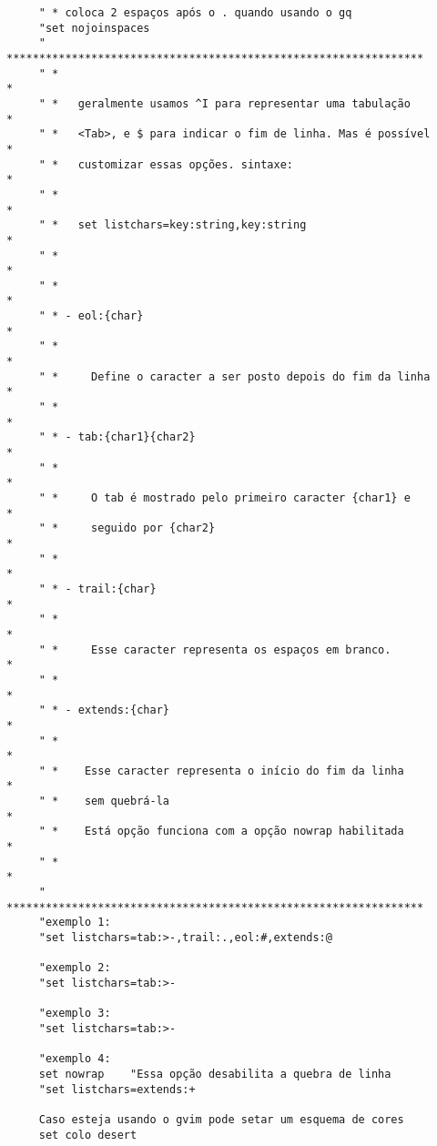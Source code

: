 \begin{verbatim}
     " * coloca 2 espaços após o . quando usando o gq
     "set nojoinspaces
     " ****************************************************************
     " *                                                              *
     " *   geralmente usamos ^I para representar uma tabulação        *
     " *   <Tab>, e $ para indicar o fim de linha. Mas é possível     *
     " *   customizar essas opções. sintaxe:                          *
     " *                                                              *
     " *   set listchars=key:string,key:string                        *
     " *                                                              *
     " *                                                              *
     " * - eol:{char}                                                 *
     " *                                                              *
     " *     Define o caracter a ser posto depois do fim da linha     *
     " *                                                              *
     " * - tab:{char1}{char2}                                         *
     " *                                                              *
     " *     O tab é mostrado pelo primeiro caracter {char1} e        *
     " *     seguido por {char2}                                      *
     " *                                                              *
     " * - trail:{char}                                               *
     " *                                                              *
     " *     Esse caracter representa os espaços em branco.           *
     " *                                                              *
     " * - extends:{char}                                             *
     " *                                                              *
     " *    Esse caracter representa o início do fim da linha         *
     " *    sem quebrá-la                                             *
     " *    Está opção funciona com a opção nowrap habilitada         * 
     " *                                                              *
     " ****************************************************************
     "exemplo 1:
     "set listchars=tab:>-,trail:.,eol:#,extends:@
     
     "exemplo 2:
     "set listchars=tab:>-
     
     "exemplo 3:
     "set listchars=tab:>-
     
     "exemplo 4:
     set nowrap    "Essa opção desabilita a quebra de linha
     "set listchars=extends:+
     
     Caso esteja usando o gvim pode setar um esquema de cores
     set colo desert
\end{verbatim}

